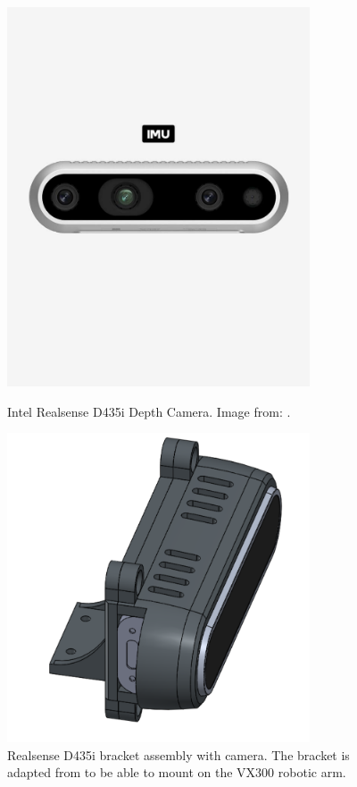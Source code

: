 \begin{figure}[H]
  \centering
  \begin{minipage}[b]{0.49\textwidth}
    \centering
    \includegraphics[width = 0.8\textwidth]{Figures/D435i.jpg}
    \caption{Intel Realsense D435i Depth Camera. Image from: \cite{realsense_d435i}.}
    \label{fig:d435i}
  \end{minipage}
  \hfill
  \begin{minipage}[b]{0.49\textwidth}
   \centering
    \includegraphics[width = 0.8\textwidth]{Figures/realsense_assembly.pdf}
    \caption{Realsense D435i bracket assembly with camera. The bracket is adapted from \cite{d435_sleeve} to be able to mount on the VX300 robotic arm.}
    \label{fig:realsense_assembly}
  \end{minipage}
\end{figure}

